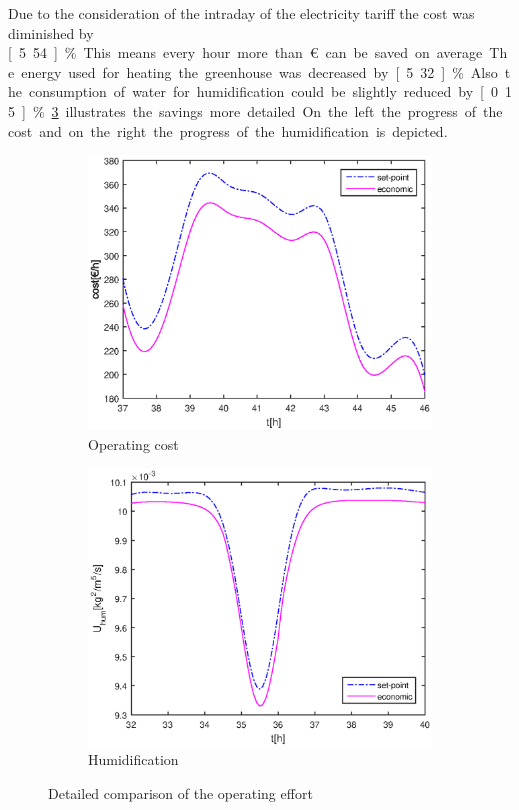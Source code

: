 Due to the consideration of the intraday of the electricity tariff the cost was diminished by \unit[5.54]{\%}.
This means every hour more than \unit[6]{\euro} can be saved on average.
The energy used for heating the greenhouse was decreased by \unit[5.32]{\%}.
Also the consumption of water for humidification could be slightly reduced by \unit[0.15]{\%}.
\cref{fig:sp_vs_eco} illustrates the savings more detailed.
On the left the progress of the cost and on the right the progress of the humidification is depicted.\par\medskip

\begin{figure}[t]
	\begin{subfigure}[t]{0.49\textwidth}
		\includegraphics[width=\textwidth]{../Figures/economic_vs_setpoint_cost.eps}
		\caption{Operating cost}
		\label{fig:versus_cost}
	\end{subfigure}
	\hfill
	\begin{subfigure}[t]{0.49\textwidth}
		\includegraphics[width=\textwidth]{../Figures/economic_vs_setpoint_hum.eps}
		\caption{Humidification}
		\label{fig:versus_hum}
	\end{subfigure}
\caption{Detailed comparison of the operating effort}
\label{fig:sp_vs_eco}
\end{figure}

